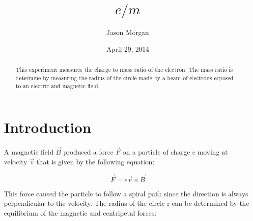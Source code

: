 \documentclass[twocolumn,secnumarabic,amssymb, nobibnotes, aps, pra]{revtex4}
\begin{document}
\title{$e/m$
 }


\author{Jason Morgan}



\date{April 29, 2014}


\begin{abstract}
This experiment measures the charge to mass ratio of the electron.  The mass ratio is determine by measuring the radius of the circle made by a beam of electrons ecposed to an electric and magnetic field.
\end{abstract}

\maketitle
\section{Introduction}

A magnetic field $\vec{B}$ produced a force $\vec{F}$ on a particle of charge e moving at velocity $\vec{v}$ that is given by the following equation:

\begin{equation}
\vec{F} = e\vec{v} \times \vec{B}
\label{eq:one}  
\end{equation}

This force caused the particle to follow a spiral path since the direction is always perpendicular to the velocity.  The radius of the circle r can be determined by the equilibrium of the magnetic and centripetal forces:
\end{document}
